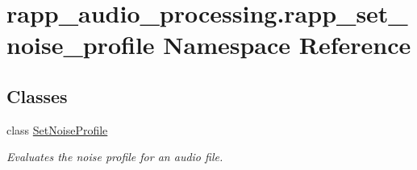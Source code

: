 \hypertarget{namespacerapp__audio__processing_1_1rapp__set__noise__profile}{\section{rapp\-\_\-audio\-\_\-processing.\-rapp\-\_\-set\-\_\-noise\-\_\-profile Namespace Reference}
\label{namespacerapp__audio__processing_1_1rapp__set__noise__profile}
}
\subsection*{Classes}
\begin{DoxyCompactItemize}
\item 
class \hyperlink{classrapp__audio__processing_1_1rapp__set__noise__profile_1_1SetNoiseProfile}{Set\-Noise\-Profile}
\begin{DoxyCompactList}\small\item\em Evaluates the noise profile for an audio file. \end{DoxyCompactList}\end{DoxyCompactItemize}
